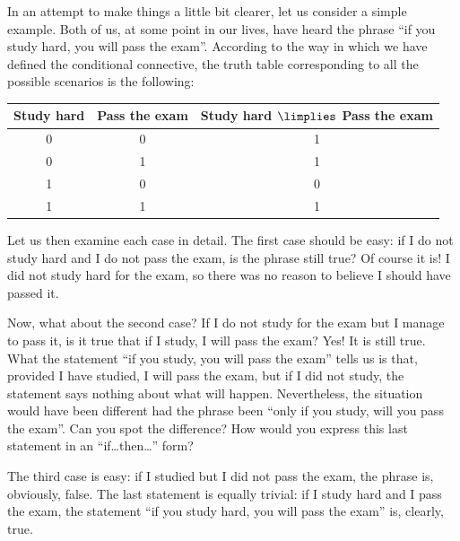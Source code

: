 \begin{example}
In an attempt to make things a little bit clearer, let us consider a simple example.
Both of us, at some point in our lives, have heard the phrase ``if you study hard, you will pass the exam''. According to the way in which we have defined the conditional connective, the truth table corresponding to all the possible scenarios is the following:
\begin{center}
\begin{tabular}[]{|c|c||c|}
\hline Study hard & Pass the exam & Study hard $\limplies$ Pass the exam \\
\hline\hline 0 & 0 & 1 \\
\hline 0 & 1 & 1 \\
\hline 1 & 0 & 0 \\
\hline 1 & 1 & 1 \\
\hline
\end{tabular}
\end{center}
Let us then examine each case in detail. The first case should be easy: if I do not study hard and I do not pass the exam, is the phrase still true? Of course it is! I did not study hard for the exam, so there was no reason to believe I should have passed it.

Now, what about the second case? If I do not study for the exam but I manage to pass it, is it true that if I study, I will pass the exam? Yes! It is still true. What the statement ``if you study, you will pass the exam'' tells us is that, provided I have studied, I will pass the exam, but if I did not study, the statement says nothing about what will happen. Nevertheless, the situation would have been different had the phrase been ``only if you study, will you pass the exam''. Can you spot the difference? How would you express this last statement in an ``if\ldots then\ldots'' form?

The third case is easy: if I studied but I did not pass the exam, the phrase is, obviously, false. The last statement is equally trivial: if I study hard and I pass the exam, the statement ``if you study hard, you will pass the exam'' is, clearly, true. 
\end{example}

